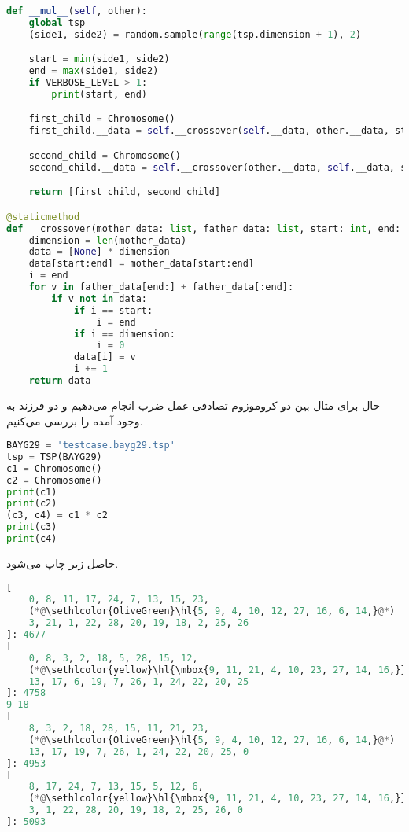 \documentclass[a4paper, 12pt]{article}
\theoremstyle{definition}
\begin{document}
\LTR
\begin{lstlisting}[language=Python]
def __mul__(self, other):
    global tsp
    (side1, side2) = random.sample(range(tsp.dimension + 1), 2)

    start = min(side1, side2)
    end = max(side1, side2)
    if VERBOSE_LEVEL > 1:
        print(start, end)

    first_child = Chromosome()
    first_child.__data = self.__crossover(self.__data, other.__data, start, end)

    second_child = Chromosome()
    second_child.__data = self.__crossover(other.__data, self.__data, start, end)

    return [first_child, second_child]

@staticmethod
def __crossover(mother_data: list, father_data: list, start: int, end: int):
    dimension = len(mother_data)
    data = [None] * dimension
    data[start:end] = mother_data[start:end]
    i = end
    for v in father_data[end:] + father_data[:end]:
        if v not in data:
            if i == start:
                i = end
            if i == dimension:
                i = 0
            data[i] = v
            i += 1
    return data
\end{lstlisting}
\RTL

حال برای مثال بین دو کروموزوم تصادفی عمل ضرب انجام می‌دهیم و دو فرزند به وجود آمده را بررسی می‌کنیم.

\LTR
\begin{lstlisting}[language=Python]
BAYG29 = 'testcase.bayg29.tsp'
tsp = TSP(BAYG29)
c1 = Chromosome()
c2 = Chromosome()
print(c1)
print(c2)
(c3, c4) = c1 * c2
print(c3)
print(c4)
\end{lstlisting}
\RTL

حاصل زیر چاپ می‌شود.

\LTR
\begin{lstlisting}[language=Python]
[
    0, 8, 11, 17, 24, 7, 13, 15, 23,
    (*@\sethlcolor{OliveGreen}\hl{5, 9, 4, 10, 12, 27, 16, 6, 14,}@*)
    3, 21, 1, 22, 28, 20, 19, 18, 2, 25, 26
]: 4677
[
    0, 8, 3, 2, 18, 5, 28, 15, 12,
    (*@\sethlcolor{yellow}\hl{\mbox{9, 11, 21, 4, 10, 23, 27, 14, 16,}}@*)
    13, 17, 6, 19, 7, 26, 1, 24, 22, 20, 25
]: 4758
9 18
[
    8, 3, 2, 18, 28, 15, 11, 21, 23,
    (*@\sethlcolor{OliveGreen}\hl{5, 9, 4, 10, 12, 27, 16, 6, 14,}@*)
    13, 17, 19, 7, 26, 1, 24, 22, 20, 25, 0
]: 4953
[
    8, 17, 24, 7, 13, 15, 5, 12, 6,
    (*@\sethlcolor{yellow}\hl{\mbox{9, 11, 21, 4, 10, 23, 27, 14, 16,}}@*)
    3, 1, 22, 28, 20, 19, 18, 2, 25, 26, 0
]: 5093    
\end{lstlisting}
\RTL
\end{document}
